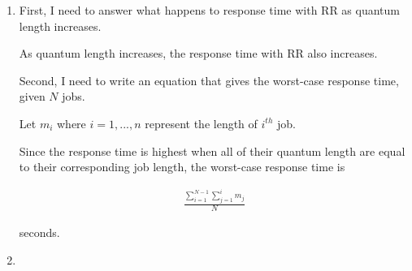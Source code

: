 \documentclass[12pt]{article}
\begin{document}
\begin{enumerate}[1.]
    \item

    First, I need to answer what happens to response time with RR as quantum length
    increases.

    \bigskip

    As quantum length increases, the response time with RR also increases.

    \bigskip

    Second, I need to write an equation that gives the worst-case response time, given
    $N$ jobs.

    \bigskip

    Let $m_i$ where $i = 1,...,n$ represent the length of $i^{th}$ job.

    \bigskip

    Since the response time is highest when all of their quantum length are equal to their corresponding job length,
    the worst-case response time is


    \begin{align}
        \frac{\sum\limits_{i=1}^{N-1}\sum\limits_{j=1}^{i} m_j}{N}
    \end{align}

    seconds.

    \item



\end{enumerate}
\end{document}
